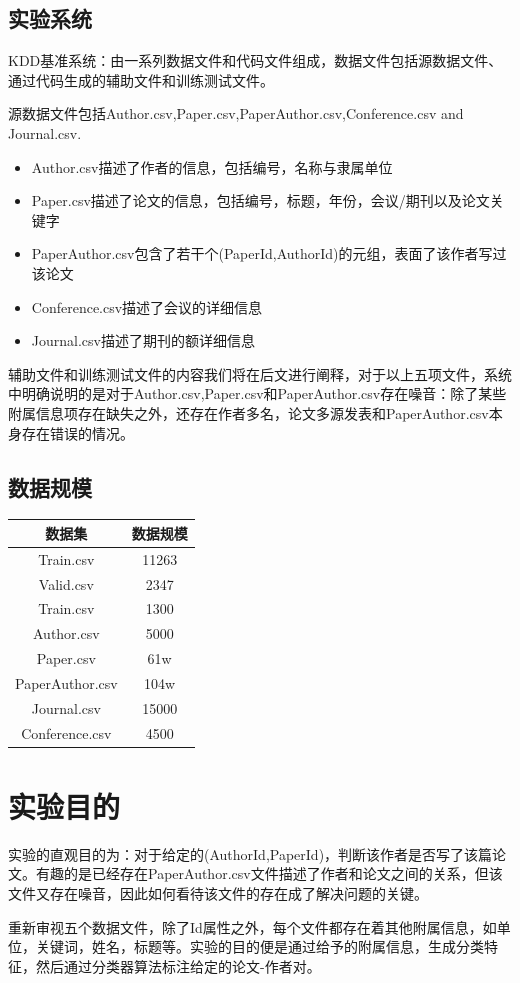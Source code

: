 \documentclass{mcmthesis}
\begin{document}
\subsection{实验系统}
\par KDD基准系统：由一系列数据文件和代码文件组成，数据文件包括源数据文件、通过代码生成的辅助文件和训练测试文件。
\par 源数据文件包括Author.csv,Paper.csv,PaperAuthor.csv,Conference.csv and Journal.csv. 
\begin{itemize}
	\item Author.csv描述了作者的信息，包括编号，名称与隶属单位
	\item Paper.csv描述了论文的信息，包括编号，标题，年份，会议/期刊以及论文关键字
	\item PaperAuthor.csv包含了若干个(PaperId,AuthorId)的元组，表面了该作者写过该论文
	\item Conference.csv描述了会议的详细信息
	\item Journal.csv描述了期刊的额详细信息
\end{itemize}
\par 辅助文件和训练测试文件的内容我们将在后文进行阐释，对于以上五项文件，系统中明确说明的是对于Author.csv,Paper.csv和PaperAuthor.csv存在噪音：除了某些附属信息项存在缺失之外，还存在作者多名，论文多源发表和PaperAuthor.csv本身存在错误的情况。
\subsection{数据规模}
\begin{center}
	\begin{tabular}{cc}
		\hline
		数据集          &   数据规模        \\
		\hline
		Train.csv       &   11263  \\
		Valid.csv       &   2347  \\
		Train.csv       &   1300  \\
		Author.csv      &   5000  \\
		Paper.csv       &   61w  \\
		PaperAuthor.csv &   104w  \\
		Journal.csv     &   15000  \\
		Conference.csv  &   4500  \\
		\hline
	\end{tabular}
\end{center}
\section{实验目的}
	\par 实验的直观目的为：对于给定的(AuthorId,PaperId)，判断该作者是否写了该篇论文。有趣的是已经存在PaperAuthor.csv文件描述了作者和论文之间的关系，但该文件又存在噪音，因此如何看待该文件的存在成了解决问题的关键。
	\par 重新审视五个数据文件，除了Id属性之外，每个文件都存在着其他附属信息，如单位，关键词，姓名，标题等。实验的目的便是通过给予的附属信息，生成分类特征，然后通过分类器算法标注给定的论文-作者对。
\end{document}

